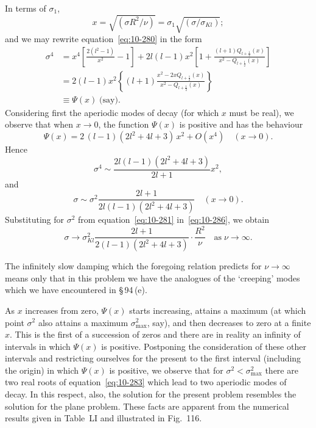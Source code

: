 In terms of $\sigma_1$,
\begin{equation}
\label{eq:10-282}
x = \sqrt{(\sigma R^2/\nu)} = \sigma_1\sqrt{(\sigma/\sigma_{Kl})};
\end{equation}
and we may rewrite equation~\eqref{eq:10-280} in the form
\begin{align}
\label{eq:10-283}
\sigma^4 &= x^4\!\left[\frac{2(l^2-1)}{x^2}-1\right]+2l(l-1)x^2\!\left[1+\frac{(l+1)Q_{l+\frac{1}{2}}(x)}{x^2-Q_{l+\frac{1}{2}}(x)}\right] \nonumber\\
&= 2(l-1)x^2\!\left\{(l+1)\frac{x^2-2xQ_{l+\frac{1}{2}}(x)}{x^2-Q_{l+\frac{1}{2}}(x)}\right\} \nonumber\\
&\equiv \Psi(x)\;\text{(say).}
\end{align}
Considering first the aperiodic modes of decay (for which $x$ must be real), we observe that when $x \to 0$, the function $\Psi(x)$ is positive and has the behaviour
\begin{equation}
\label{eq:10-284}
\Psi(x) = 2\,(l-1)(2l^2+4l+3)\,x^2+O(x^4) \quad (x \to 0).
\end{equation}
Hence
\begin{equation}
\label{eq:10-285}
\sigma^4 \sim \frac{2l(l-1)(2l^2+4l+3)}{2l+1}x^2,
\end{equation}
and
\begin{equation}
\label{eq:10-286}
\sigma \sim \sigma^2\frac{2l+1}{2l(l-1)(2l^2+4l+3)} \quad (x \to 0).
\end{equation}
Substituting for $\sigma^2$ from equation~\eqref{eq:10-281} in~\eqref{eq:10-286}, we obtain
\begin{equation}
\label{eq:10-287}
\sigma \to \sigma_{Kl}^2\frac{2l+1}{2(l-1)(2l^2+4l+3)}\cdot\frac{R^2}{\nu} \quad\text{as}\;\nu \to \infty.
\end{equation}

The infinitely slow damping which the foregoing relation predicts for $\nu \to \infty$ means only that in this problem we have the analogues of the `creeping' modes which we have encountered in \S\,94\,(e).

As $x$ increases from zero, $\Psi(x)$ starts increasing, attains a maximum (at which point $\sigma^2$ also attains a maximum $\sigma_{\max}^2$, say), and then decreases to zero at a finite $x$. This is the first of a succession of zeros and there are in reality an infinity of intervals in which $\Psi(x)$ is positive. Postponing the consideration of these other intervals and restricting ourselves for the present to the first interval (including the origin) in which $\Psi(x)$ is positive, we observe that for $\sigma^2 < \sigma_{\max}^2$ there are two real roots of equation~\eqref{eq:10-283} which lead to two aperiodic modes of decay. In this respect, also, the solution for the present problem resembles the solution for the plane problem. These facts are apparent from the numerical results given in Table~LI and illustrated in Fig.~116.

